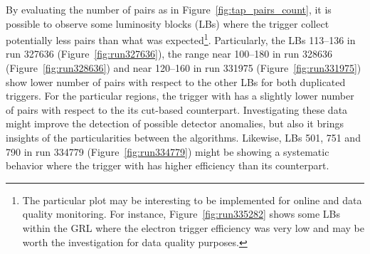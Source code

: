 By evaluating the number of \Zee{} \tnp{} pairs as in
Figure~\ref{fig:tap_pairs_count}, it is possible to observe some luminosity
blocks (LBs) where the trigger collect potentially less pairs than what was 
expected\footnote{The particular plot may be interesting to be implemented for
online and data quality monitoring. For instance, Figure~\ref{fig:run335282}
shows some LBs within the GRL where the \Zee{} \tnp{} electron trigger
efficiency was very low and may be worth the investigation for data quality
purposes.}.  Particularly, the LBs 113--136 in run 327636
(Figure~\ref{fig:run327636}), the range near 100--180 in run 328636
(Figure~\ref{fig:run328636}) and near 120--160 in run 331975
(Figure~\ref{fig:run331975}) show lower number of pairs with respect to the
other LBs for both duplicated triggers. For the particular regions, the trigger
with \rnn{} has a slightly lower number of pairs with respect to the its
cut-based counterpart. Investigating these data might improve the detection of
possible detector anomalies, but also it brings insights of the particularities
between the algorithms. Likewise, LBs 501, 751 and 790 in run 334779
(Figure~\ref{fig:run334779}) might be showing a systematic behavior where the
trigger with \rnn{} has higher efficiency than its counterpart.


